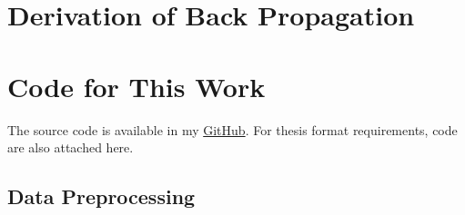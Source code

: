 
\chapter{Derivation of Back Propagation}

\chapter{Code for This Work}
The source code is available in my \href{https://github.com/CrazyRundong/deep-stress}{GitHub}.
For thesis format requirements, code are also attached here.

\section{Data Preprocessing}
